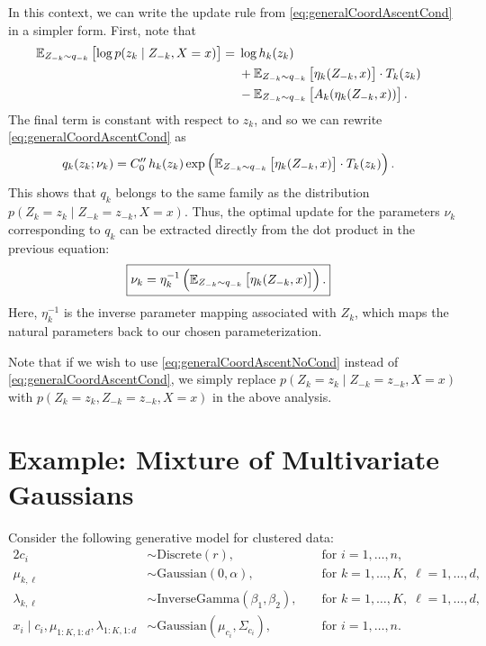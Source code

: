 \documentclass[11pt]{article}
\newcommand{\Discrete}{\mathrm{Discrete}}
\newcommand{\Gaussian}{\mathrm{Gaussian}}
\newcommand{\InverseGamma}{\mathrm{InverseGamma}}
\begin{document}
In this context, we can write the update rule from \eqref{eq:generalCoordAscentCond} in a simpler form.
First, note that
\begin{align}
\mathbb{E}_{\substack{Z_{-k} \sim q_{-k}}}\left[  \log p(z_k \mid Z_{-k}, X = x)  \right]
&= \begin{aligned}[t]
    &\log h_k(z_k) \\
    &+ \mathbb{E}_{\substack{Z_{-k} \sim q_{-k}}}\left[  \eta_k(Z_{-k}, x)  \right] \cdot T_k(z_k) \\
    &- \mathbb{E}_{\substack{Z_{-k} \sim q_{-k}}}\left[  A_k(\eta_k(Z_{-k}, x))  \right].
    \end{aligned}
\end{align}
The final term is constant with respect to $z_k$, and so we can rewrite \eqref{eq:generalCoordAscentCond} as
\begin{align}
q_k(z_k; \nu_k)
&=
C''_0 \, h_k(z_k) \exp\left( \mathbb{E}_{\substack{Z_{-k} \sim q_{-k}}}\left[ \eta_k(Z_{-k}, x) \right] \cdot T_k(z_k) \right).
\end{align}
This shows that $q_k$ belongs to the same family as the distribution $p(Z_k = z_k \mid Z_{-k} = z_{-k}, X = x)$.
Thus, the optimal update for the parameters $\nu_k$ corresponding to $q_k$ can be extracted directly from the dot product in the previous equation:
\begin{align}
\label{eq:paramUpdate}
\Aboxed{
\nu_k
&=
\eta_k^{-1} \left(
    \expectOver{Z_{-k} \sim q_{-k}}{ \eta_k(Z_{-k}, x) }
\right).
}
\end{align}
Here, $\eta_k^{-1}$ is the inverse parameter mapping associated with $Z_k$, which maps the natural parameters back to our chosen parameterization.

Note that if we wish to use \eqref{eq:generalCoordAscentNoCond} instead of \eqref{eq:generalCoordAscentCond},
we simply replace $p(Z_k = z_k \mid Z_{-k} = z_{-k}, X = x)$ with $p(Z_k = z_k, Z_{-k} = z_{-k}, X = x)$ in the above analysis.

\section{Example: Mixture of Multivariate Gaussians}

Consider the following generative model for clustered data:
\begin{alignat}{2}
c_i &\sim \Discrete(r), &&\text{ for } i = 1, \ldots, n, \\
\mu_{k, \ell} &\sim \Gaussian(0, \alpha), &&\text{ for } k = 1, \ldots, K, \; \ell = 1, \ldots, d, \\
\lambda_{k, \ell} &\sim \InverseGamma(\beta_1, \beta_2), &&\text{ for } k = 1, \ldots, K, \; \ell = 1, \ldots, d, \\
x_i \mid c_i, \mu_{1:K,1:d}, \lambda_{1:K,1:d} &\sim \Gaussian(\mu_{c_i}, \Sigma_{c_i}), &&\text{ for } i = 1, \ldots, n.
\end{alignat}
\end{document}
